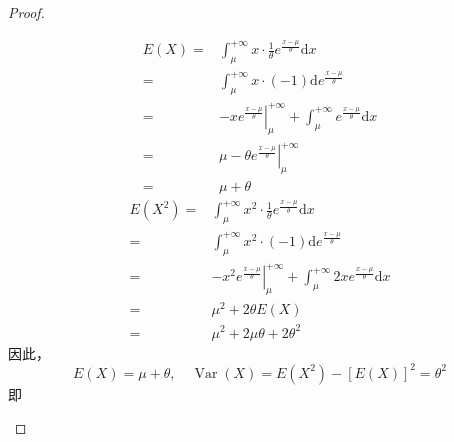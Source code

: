 \documentclass[normal,founder,mtpro2,cn]{elegantnote}
\begin{document}
\begin{enumerate}
\begin{proof}
\begin{enumerate}
\begin{equation*}
\begin{aligned}
                              E(X)= & \int_{\mu}^{+\infty}x\cdot\frac{1}{\theta}e^{\frac{x-\mu}{\theta}}\mathrm{d}x                                   \\
                              =     & \int_{\mu}^{+\infty}x\cdot(-1)\mathrm{d}e^{\frac{x-\mu}{\theta}}                                                \\
                              =     & -\left.xe^{\frac{x-\mu}{\theta}}\right|_{\mu}^{+\infty}+\int_{\mu}^{+\infty}e^{\frac{x-\mu}{\theta}}\mathrm{d}x \\
                              =     & \mu-\left.\theta e^{\frac{x-\mu}{\theta}}\right|_{\mu}^{+\infty}                                                \\
                              =     & \mu+\theta
                          \end{aligned}
                      \end{equation*}
                      \begin{equation*}
                          \begin{aligned}
                              E\left(X^{2}\right)  = & \int_{\mu}^{+\infty}x^{2}\cdot\frac{1}{\theta}e^{\frac{x-\mu}{\theta}}\mathrm{d}x                                     \\
                              =                      & \int_{\mu}^{+\infty}x^{2}\cdot(-1)\mathrm{d}e^{\frac{x-\mu}{\theta}}                                                  \\
                              =                      & -\left.x^{2}e^{\frac{x-\mu}{\theta}}\right|_{\mu}^{+\infty}+\int_{\mu}^{+\infty}2xe^{\frac{x-\mu}{\theta}}\mathrm{d}x \\
                              =                      & \mu^{2}+2\theta E(X)                                                                                                  \\
                              =                      & \mu^{2}+2\mu\theta+2\theta^{2}
                          \end{aligned}
                      \end{equation*}
                      因此，
                      \begin{equation*}
                          E(X)=\mu+\theta,\quad\operatorname{Var}(X)=E\left(X^{2}\right)-[E(X)]^{2}=\theta^{2}
                      \end{equation*}
                      即
                      \begin{equation*}

\end{equation*}
\end{enumerate}
\end{proof}
\end{enumerate}
\end{document}
